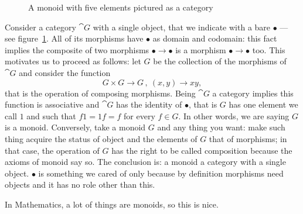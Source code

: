 \begin{figure}
\centering
{}
\caption{A monoid with five elements pictured as a category}
\label{fig:MonsAreCats}
\end{figure}

\begin{example}[Monoids]
Consider a category \(\cat G\) with a single object, that we indicate with a bare \(\bullet\) --- see figure~\ref{fig:MonsAreCats}. All of its morphisms have \(\bullet\) as domain and codomain: this fact implies the composite of two morphisms \(\bullet \to \bullet\) is a morphism \(\bullet \to \bullet\) too. This motivates us to proceed as follows: let \(G\) be the collection of the morphisms of \(\cat G\) and consider the function
\[G \times G \to G\,,\ (x, y) \to xy ,\]
that is the operation of composing morphisms. Being \(\cat G\) a category implies this function is associative and \(\cat G\) has the identity of \(\bullet\), that is \(G\) has one element we call \(1\) and such that \(f1 = 1f = f\) for every \(f \in G\). In other words, we are saying \(G\) is a monoid.\newline
Conversely, take a monoid \(G\) and any thing you want: make such thing acquire the status of object and the elements of \(G\) that of morphisms; in that case, the operation of \(G\) has the right to be called composition because the axioms of monoid say so.\newline
The conclusion is: a monoid  a category with a single object. \(\bullet\) is something we cared of only because by definition morphisms need objects and it has no role other than this.
\end{example}

In Mathematics, a lot of things are monoids, so this is nice.

